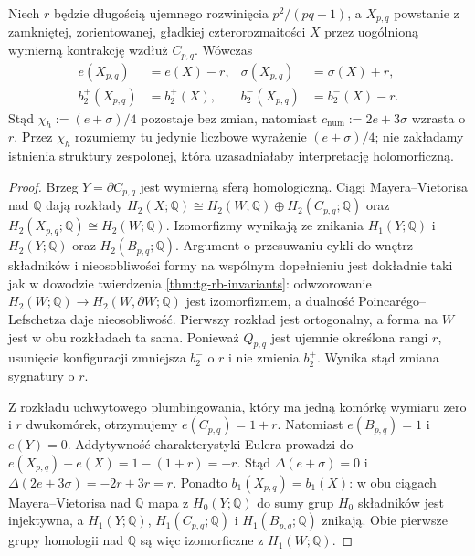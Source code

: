 \begin{twierdzenie}
\label{thm:tg-general-numeric}
Niech $r$ będzie długością ujemnego rozwinięcia
$p^2/(pq-1)$, a $X_{p,q}$ powstanie z zamkniętej,
zorientowanej, gładkiej czterorozmaitości $X$
przez uogólnioną wymierną kontrakcję wzdłuż $C_{p,q}$.
Wówczas
\[
\begin{aligned}
e(X_{p,q})&=e(X)-r,&
\sigma(X_{p,q})&=\sigma(X)+r,\\
b_2^+(X_{p,q})&=b_2^+(X),&
b_2^-(X_{p,q})&=b_2^-(X)-r.
\end{aligned}
\]
Stąd $\chi_h:=(e+\sigma)/4$ pozostaje bez zmian,
natomiast $c_{\mathrm{num}}:=2e+3\sigma$ wzrasta o $r$.
Przez $\chi_h$ rozumiemy tu jedynie liczbowe wyrażenie
$(e+\sigma)/4$; nie zakładamy istnienia struktury
zespolonej, która uzasadniałaby interpretację holomorficzną.
\end{twierdzenie}

\begin{proof}
Brzeg $Y=\partial C_{p,q}$ jest wymierną sferą homologiczną.
Ciągi Mayera--Vietorisa nad $\mathbb Q$ dają rozkłady
$H_2(X;\mathbb Q)\cong H_2(W;\mathbb Q)\oplus
H_2(C_{p,q};\mathbb Q)$ oraz
$H_2(X_{p,q};\mathbb Q)\cong H_2(W;\mathbb Q)$.
Izomorfizmy wynikają ze znikania $H_1(Y;\mathbb Q)$
i $H_2(Y;\mathbb Q)$ oraz $H_2(B_{p,q};\mathbb Q)$.
Argument o przesuwaniu cykli do wnętrz składników
i nieosobliwości formy na wspólnym dopełnieniu
jest dokładnie taki jak w dowodzie twierdzenia
\ref{thm:tg-rb-invariants}: odwzorowanie
$H_2(W;\mathbb Q)\to H_2(W,\partial W;\mathbb Q)$
jest izomorfizmem, a dualność Poincarégo--Lefschetza
daje nieosobliwość. Pierwszy rozkład jest ortogonalny,
a forma na $W$ jest w obu rozkładach ta sama.
Ponieważ $Q_{p,q}$ jest ujemnie określona
rangi $r$, usunięcie konfiguracji zmniejsza $b_2^-$ o $r$
i nie zmienia $b_2^+$. Wynika stąd zmiana sygnatury o $r$.

Z rozkładu uchwytowego plumbingowania, który ma jedną
komórkę wymiaru zero i $r$ dwukomórek, otrzymujemy
$e(C_{p,q})=1+r$. Natomiast $e(B_{p,q})=1$
i $e(Y)=0$. Addytywność charakterystyki Eulera prowadzi do
$e(X_{p,q})-e(X)=1-(1+r)=-r$.
Stąd $\Delta(e+\sigma)=0$ i
$\Delta(2e+3\sigma)=-2r+3r=r$.
Ponadto $b_1(X_{p,q})=b_1(X)$:
w obu ciągach Mayera--Vietorisa nad $\mathbb Q$
mapa z $H_0(Y;\mathbb Q)$ do sumy grup $H_0$
składników jest injektywna, a $H_1(Y;\mathbb Q)$,
$H_1(C_{p,q};\mathbb Q)$ i $H_1(B_{p,q};\mathbb Q)$
znikają. Obie pierwsze grupy homologii nad $\mathbb Q$
są więc izomorficzne z $H_1(W;\mathbb Q)$.
\end{proof}

